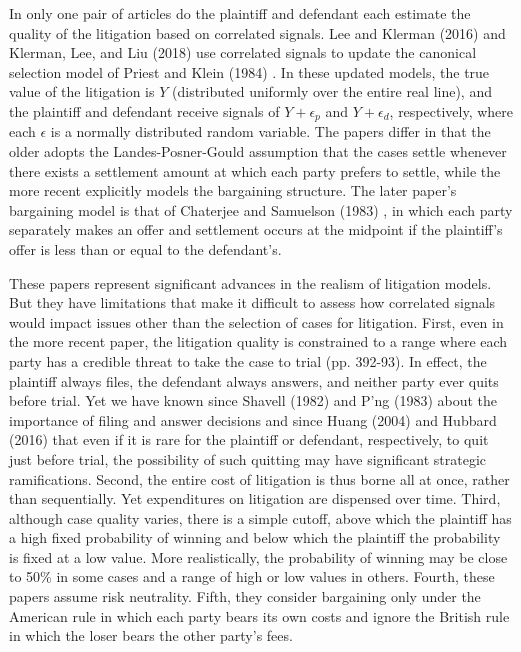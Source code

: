 \documentclass{article}
\begin{document}
In only one pair of articles do the plaintiff and defendant each estimate the quality of the litigation based on correlated signals. Lee and Klerman (2016) \cite{leeklerman} and Klerman, Lee, and Liu (2018) \cite{klermanleeliu} use correlated signals to update the canonical selection model of Priest and Klein (1984) \cite{priestklein}. In these updated models, the true value of the litigation is $Y$ (distributed uniformly over the entire real line), and the plaintiff and defendant receive signals of $Y + \epsilon_p$ and $Y + \epsilon_d$, respectively, where each $\epsilon$ is a normally distributed random variable. The papers differ in that the older adopts the Landes-Posner-Gould assumption that the cases settle whenever there exists a settlement amount at which each party prefers to settle, while the more recent explicitly models the bargaining structure. The later paper's bargaining model is that of Chaterjee and Samuelson (1983) \cite{chatterjeesamuelson}, in which each party separately makes an offer and settlement occurs at the midpoint if the plaintiff's offer is less than or equal to the defendant's. 

These papers represent significant advances in the realism of litigation models. But they have limitations that make it difficult to assess how correlated signals would impact issues other than the selection of cases for litigation. First, even in the more recent paper, the litigation quality is constrained to a range where each party has a credible threat to take the case to trial (pp. 392-93). In effect, the plaintiff always files, the defendant always answers, and neither party ever quits before trial. Yet we have known since Shavell (1982) \cite{shavell} and P'ng (1983) \cite{png} about the importance of filing and answer decisions and since Huang (2004) \cite{huang} and Hubbard (2016) \cite{hubbard} that even if it is rare for the plaintiff or defendant, respectively, to quit just before trial, the possibility of such quitting may have significant strategic ramifications. Second, the entire cost of litigation is thus borne all at once, rather than sequentially. Yet expenditures on litigation are dispensed over time. Third, although case quality varies, there is a simple cutoff, above which the plaintiff has a high fixed probability of winning and below which the plaintiff the probability is fixed at a low value. More realistically, the probability of winning may be close to 50\% in some cases and a range of high or low values in others. Fourth, these papers assume risk neutrality. Fifth, they consider bargaining only under the American rule in which each party bears its own costs and ignore the British rule in which the loser bears the other party's fees. 
\end{document}
